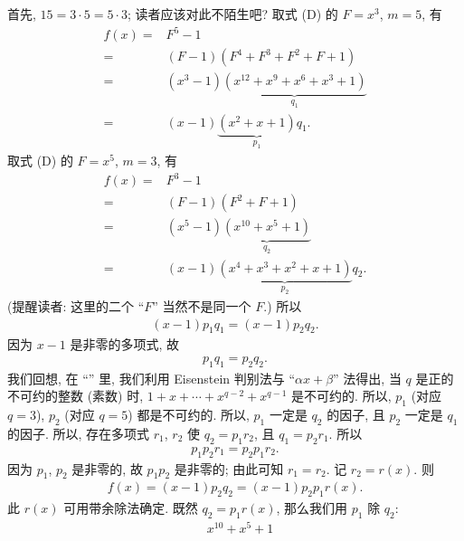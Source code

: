 \begin{example}
    首先, $15 = 3 \cdot 5 = 5 \cdot 3$; 读者应该对此不陌生吧? 取式 (D) 的 $F = x^3$, $m = 5$, 有
    \begin{align*}
        f(x)
        = {} & F^5 - 1                                                     \\
        = {} & (F - 1) (F^4 + F^3 + F^2 + F + 1)                           \\
        = {} & (x^3 - 1) \underbrace{(x^{12} + x^9 + x^6 + x^3 + 1)}_{q_1} \\
        = {} & (x - 1) \underbrace{(x^2 + x + 1)}_{p_1} q_1.
    \end{align*}
    取式 (D) 的 $F = x^5$, $m = 3$, 有
    \begin{align*}
        f(x)
        = {} & F^3 - 1                                                   \\
        = {} & (F - 1) (F^2 + F + 1)                                     \\
        = {} & (x^5 - 1) \underbrace{(x^{10} + x^5 + 1)}_{q_2}           \\
        = {} & (x - 1) \underbrace{(x^4 + x^3 + x^2 + x + 1)}_{p_2} q_2.
    \end{align*}
    (提醒读者: 这里的二个 ``$F$'' 当然不是同一个 $F$.) 所以
    \begin{align*}
        (x - 1) p_1 q_1 = (x - 1) p_2 q_2.
    \end{align*}
    因为 $x-1$ 是非零的多项式, 故
    \begin{align*}
        p_1 q_1 = p_2 q_2.
    \end{align*}
    我们回想, 在 ``\PolynomialsOverZAndOverQ '' 里, 我们利用 Eisenstein 判别法与 ``$\alpha x + \beta$'' 法得出, 当 $q$ 是正的不可约的整数 (素数) 时, $1 + x + \cdots + x^{q-2} + x^{q-1}$ 是不可约的. 所以, $p_1$ (对应 $q = 3$), $p_2$ (对应 $q = 5$) 都是不可约的. 所以, $p_1$ 一定是 $q_2$ 的因子, 且 $p_2$ 一定是 $q_1$ 的因子. 所以, 存在多项式 $r_1$, $r_2$ 使 $q_2 = p_1 r_2$, 且 $q_1 = p_2 r_1$. 所以
    \begin{align*}
        p_1 p_2 r_1 = p_2 p_1 r_2.
    \end{align*}
    因为 $p_1$, $p_2$ 是非零的, 故 $p_1 p_2$ 是非零的; 由此可知 $r_1 = r_2$. 记 $r_2 = r(x)$. 则
    \begin{align*}
        f(x) = (x - 1) p_2 q_2 = (x - 1) p_2 p_1 r(x).
    \end{align*}
    此 $r(x)$ 可用带余除法确定. 既然 $q_2 = p_1 r(x)$, 那么我们用 $p_1$ 除 $q_2$:
    \begin{align*}
             & x^{10} + x^5 + 1                                                      \\

\end{align*}
\end{example}
